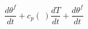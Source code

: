 \begin{equation}
[(h^f-h^g) + (T- T_{ref}) (c_p^f-c_p^g) ]\frac{d\theta^f }{dt} + c_p(\ ) \frac{d T}{dt} +   \frac{d\theta^f }{dt}
\end{equation}